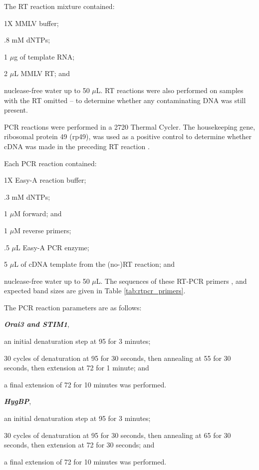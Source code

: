 The RT reaction mixture contained:
\begin{inparaenum}[(i)] 
\item 1X MMLV buffer;
\item .8 mM dNTPs; 
\item 1 $\mu$g of template RNA; 
\item 2 $\mu$L MMLV RT; and
\item nuclease-free water up to 50 $\mu$L. 
RT reactions were also performed on samples with the RT omitted -- to determine whether any contaminating DNA was still present. 
\end{inparaenum}

PCR reactions were performed in a 2720 Thermal Cycler. The \droso{} housekeeping gene, ribosomal protein 49 (rp49), was used as a positive control to determine whether cDNA was made in the preceding RT reaction \citep{Bunch1988, Luce-Fedrow2008}.


Each PCR reaction contained:
\begin{inparaenum}[(i)] 
\item 1X Easy-A reaction buffer;
\item .3 mM dNTPs;
\item 1 $\mu$M forward; and
\item 1 $\mu$M reverse primers; 
\item .5 $\mu$L Easy-A PCR enzyme; 
\item 5 $\mu$L of cDNA template from the (no-)RT reaction; and
\item nuclease-free water up to 50 $\mu$L. The sequences of these RT-PCR primers \citep{Luce-Fedrow2008, Mignen2008a, Xu2010}, and expected band sizes are given in Table \ref{tab:rtpcr_primers}.
\end{inparaenum}

The PCR reaction parameters are as follows: 

\textbf{\itshape
Orai3 and STIM1},
\begin{inparaenum}[(i)]
\item an initial denaturation step at 95 \textcelsius{} for 3 minutes;
\item 30 cycles of denaturation at 95 \textcelsius{} for 30 seconds, then annealing at 55 \textcelsius{} for 30 seconds, then extension at 72 \textcelsius{} for 1 minute; and
\item a final extension of 72 \textcelsius{} for 10 minutes was performed. 
\end{inparaenum}

\textbf{\itshape HygBP}, 
\begin{inparaenum}[(i)]
\item an initial denaturation step at 95 \textcelsius{} for 3 minutes;
\item 30 cycles of denaturation at 95 \textcelsius{} for 30 seconds, then annealing at 65 \textcelsius{} for 30 seconds, then extension at 72 \textcelsius{} for 30 seconds; and
\item a final extension of 72 \textcelsius{} for 10 minutes was performed. 
\end{inparaenum}

